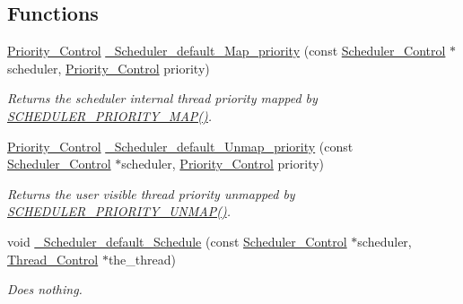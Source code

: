 \subsection*{Functions}
\begin{DoxyCompactItemize}
\item 
\mbox{\hyperlink{group__RTEMSScorePriority_ga59d02b58072d31a9a1cfe644557aefe2}{Priority\+\_\+\+Control}} \mbox{\hyperlink{group__RTEMSScoreScheduler_ga600573e84d5b76934c9fed0c29589653}{\+\_\+\+Scheduler\+\_\+default\+\_\+\+Map\+\_\+priority}} (const \mbox{\hyperlink{struct__Scheduler__Control}{Scheduler\+\_\+\+Control}} $\ast$scheduler, \mbox{\hyperlink{group__RTEMSScorePriority_ga59d02b58072d31a9a1cfe644557aefe2}{Priority\+\_\+\+Control}} priority)
\begin{DoxyCompactList}\small\item\em Returns the scheduler internal thread priority mapped by \mbox{\hyperlink{group__RTEMSScoreScheduler_gabfbb467344bb96c6bbc1b5afe3442655}{S\+C\+H\+E\+D\+U\+L\+E\+R\+\_\+\+P\+R\+I\+O\+R\+I\+T\+Y\+\_\+\+M\+A\+P()}}. \end{DoxyCompactList}\item 
\mbox{\hyperlink{group__RTEMSScorePriority_ga59d02b58072d31a9a1cfe644557aefe2}{Priority\+\_\+\+Control}} \mbox{\hyperlink{group__RTEMSScoreScheduler_gac104a3f3b704b8f1328564c6b7ca3a7b}{\+\_\+\+Scheduler\+\_\+default\+\_\+\+Unmap\+\_\+priority}} (const \mbox{\hyperlink{struct__Scheduler__Control}{Scheduler\+\_\+\+Control}} $\ast$scheduler, \mbox{\hyperlink{group__RTEMSScorePriority_ga59d02b58072d31a9a1cfe644557aefe2}{Priority\+\_\+\+Control}} priority)
\begin{DoxyCompactList}\small\item\em Returns the user visible thread priority unmapped by \mbox{\hyperlink{group__RTEMSScoreScheduler_gaa878c63b883116f813b814c90f8af849}{S\+C\+H\+E\+D\+U\+L\+E\+R\+\_\+\+P\+R\+I\+O\+R\+I\+T\+Y\+\_\+\+U\+N\+M\+A\+P()}}. \end{DoxyCompactList}\item 
void \mbox{\hyperlink{group__RTEMSScoreScheduler_gab9db9fe00bcefc7ec1609ec3667e403e}{\+\_\+\+Scheduler\+\_\+default\+\_\+\+Schedule}} (const \mbox{\hyperlink{struct__Scheduler__Control}{Scheduler\+\_\+\+Control}} $\ast$scheduler, \mbox{\hyperlink{struct__Thread__Control}{Thread\+\_\+\+Control}} $\ast$the\+\_\+thread)
\begin{DoxyCompactList}\small\item\em Does nothing. \end{DoxyCompactList}\item 

\end{DoxyCompactItemize}
